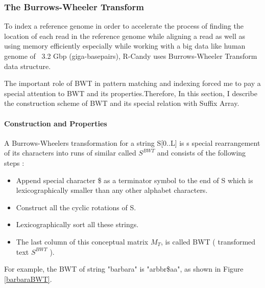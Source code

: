 \documentclass[11pt,a4paper]{report}
\begin{document}
\subsubsection{The Burrows-Wheeler Transform} \label{The Burrows-Wheeler Transform}

To index a reference genome in order to accelerate the process of finding the 
location of each read in the reference genome while aligning a read as well as
using memory efficiently especially while working with a big data like human 
genome of ~3.2 Gbp (giga-basepairs), R-Candy uses Burrows-Wheeler Transform 
data structure.

The important role of BWT in pattern matching and indexing forced me to pay a 
special attention to BWT and its properties.Therefore, In this section, I 
describe the construction scheme of BWT and its special relation with Suffix Array.\\

\paragraph{Construction and Properties}

A Burrows-Wheelers transformation for a string S[0..L] is s special rearrangement 
of its characters into runs of similar called $S^{BWT}$ and consists of the 
following steps \cite{bwt}:

\begin{itemize} 
	\item Append special character \$ as a terminator symbol to the end of S 
	which is lexicographically smaller than any other alphabet characters.
	\item  Construct all the cyclic rotations of S.
	\item  Lexicographically sort all these strings.
	\item The last column of this conceptual matrix \emph{$M_{T}$}, is called 
	BWT ( transformed text $S^{BWT}$ ).
\end{itemize}


For example, the BWT of string "barbara" is "arbbr\$aa", as shown in Figure \ref{barbaraBWT}.\\
\end{document}
